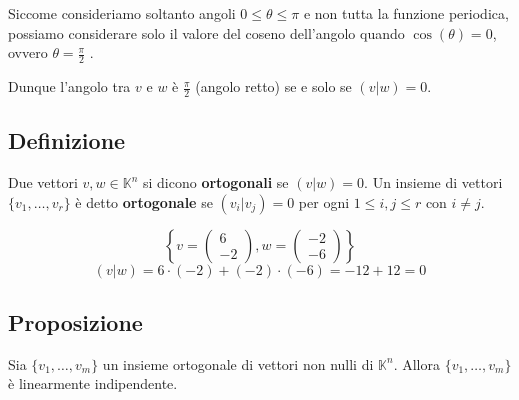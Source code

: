 \documentclass[a4paper]{article}
\theoremstyle{break}
\theoremstyle{break}
\theoremstyle{break}
\theoremstyle{break}
\begin{document}
  \noindent Siccome consideriamo soltanto angoli \( 0 \le \theta \le \pi \) e non
  tutta la funzione periodica, possiamo considerare solo il valore del coseno
  dell'angolo quando \( \cos(\theta) = 0 \), ovvero \( \theta = \frac{\pi }{2} \)  .

  \vspace{1em}
  \noindent Dunque l'angolo tra \( v \) e \( w \) è \( \frac{\pi }{2} \) (angolo retto) se
  e solo se \( (v|w) = 0 \).

\subsection{Definizione}
Due vettori \( v,w \in \mathbb{K}^n \) si dicono \textbf{ortogonali} se \( (v|w) = 0 \).
Un insieme di vettori \( \{v_1, \ldots, v_r\} \) è detto \textbf{ortogonale} se
\( (v_i|v_j) = 0 \) per ogni \( 1 \le i,j \le r \) con \( i \neq j \).

\begin{example}
  \[
  \left\{ 
    v =
    \begin{pmatrix} 
      6\\
      -2
    \end{pmatrix},
    w =
    \begin{pmatrix} 
      -2\\
      -6
    \end{pmatrix} 
  \right\} 
  \] 
  \[
    (v|w) = 6 \cdot (-2) + (-2) \cdot (-6) = -12 + 12 = 0
  \] 

  \begin{figure}[H]
    \centering
  \end{figure}
\end{example}

\subsection{Proposizione}
\label{11.5}
Sia \( \{v_1, \ldots, v_m\}  \) un insieme ortogonale di vettori non nulli di \( \mathbb{K}^n \).
Allora \( \{v_1, \ldots, v_m\}  \) è linearmente indipendente.
\end{document}
